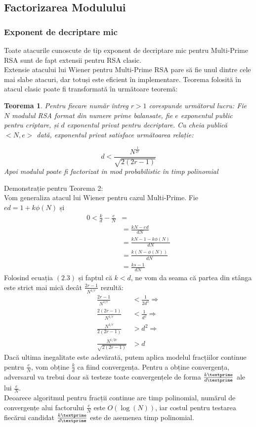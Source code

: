 \documentclass[12pt, oneside]{book}
\newtheorem{theorem}{Teorema}
\begin{document}
\subsection{Factorizarea Modulului}
\subsubsection{Exponent de decriptare mic}
Toate atacurile cunoscute de tip exponent de decriptare mic pentru Multi-Prime RSA sunt de fapt extensii pentru RSA clasic. \\
Extensie atacului lui Wiener pentru Multi-Prime RSA pare să fie unul dintre cele mai slabe atacuri, dar totuși este eficient în implementare. Teorema folosită în atacul clasic poate fi transformată în următoare teoremă:
\begin{theorem}
Pentru fiecare număr întreg $r>1$ corespunde următorul lucru: Fie $N$ modulul RSA format din numere prime balansate, fie $e$ exponentul public pentru criptare, și $d$ exponentul privat pentru decriptare. Cu cheia publică \\ $<N,e>$ dată, exponentul privat satisface următoarea relație:

 $$d< \frac{N^{\frac{1}{2r}}}{ \sqrt{2(2r-1)}}$$
 Apoi modulul poate fi factorizat in mod probabilistic în timp polinomial
\end{theorem}
Demonstrație pentru Teorema 2: \\
Vom generaliza atacul lui Wiener pentru cazul Multi-Prime. Fie $ed=1+k\phi(N)$ și
\begin{align*}
0< \frac{k}{d} - \frac{e}{N} &= \\
&= \frac{kN -ed}{dN}  \\
&= \frac{kN -1 -k\phi(N)}{dN}  \\
&= \frac{k(N-\phi(N))}{dN}  \\
&= \frac{ks -1}{dN}
\end{align*}
Folosind ecuația $(2.3)$ și faptul că $k<d$, ne vom da seama că partea din stânga este strict mai mică decât $\frac{2r-1}{N^{1/r}}$ rezultă:
\begin{align*}
\frac{2r-1}{N^{1/r}} &<\frac{1}{2d^2} \Rightarrow\\
\frac{2(2r-1)}{N^{1/r}} &< \frac{1}{d^2} \Rightarrow \\
\frac{N^{1/r}}{2(2r-1)} &> d^2 \Rightarrow \\
\frac{N^{1/2r}}{\sqrt{2(2r-1)}} &> d 
\end{align*}
Dacă ultima inegalitate este adevărată, putem aplica modelul fracțiilor continue pentru $\frac{e}{N}$, vom obține $\frac{k}{d}$ ca fiind convergența. Pentru a obține convergența, adversarul va trebui doar să testeze toate convergențele de forma $\frac{k\textprime}{d\textprime}$ ale lui $\frac{e}{N}$. \\
Deoarece algoritmul pentru fracții continue are timp polinomial, numărul de convergențe alui factorului $\frac{e}{N}$ este $O(\log(N))$, iar costul pentru testarea fiecărui candidat $\frac{k\textprime}{d\textprime} $ este de asemenea timp polinomial.
\end{document}
